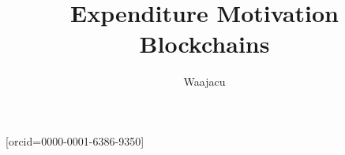 \documentclass[a4paper,fleqn]{cas-sc}
\begin{document}
\let\WriteBookmarks\relax
\def\floatpagepagefraction{1}
\def\textpagefraction{.001}

\title[mode = title]{Expenditure Motivation Blockchains}




  \author[1]{Waajacu}[orcid=0000-0001-6386-9350]
  \cormark[1] 


  \address[1]{Santiago Restrepo Ruiz, Colombia.}




\end{document}

